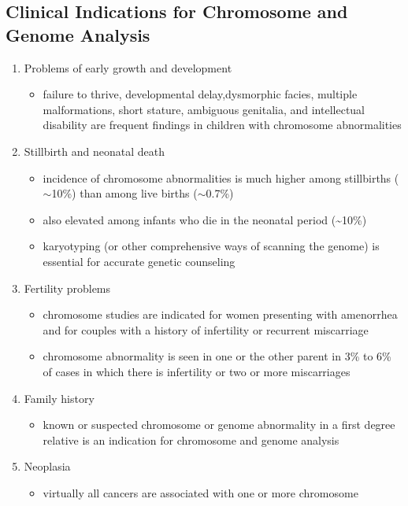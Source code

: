 \documentclass{scrartcl}
\begin{document}
\subsection{Clinical Indications for Chromosome and Genome Analysis}
\label{sec:orgbe95daf}
\begin{enumerate}
\item Problems of early growth and development
\label{sec:org5ad2b80}
\begin{itemize}
\item failure to thrive, developmental delay,dysmorphic facies, multiple
malformations, short stature, ambiguous genitalia, and
intellectual disability are frequent findings in children with
chromosome abnormalities
\end{itemize}
\item Stillbirth and neonatal death
\label{sec:orgbf22e3a}
\begin{itemize}
\item incidence of chromosome abnormalities is much higher among
stillbirths (\(\sim\)10\%) than among live births (\(\sim\)0.7\%)
\item also elevated among infants who die in the neonatal period (\textasciitilde{}10\%)
\item karyotyping (or other comprehensive ways of scanning the genome) is
essential for accurate genetic counseling
\end{itemize}
\item Fertility problems
\label{sec:org7eff294}
\begin{itemize}
\item chromosome studies are indicated for women presenting with
amenorrhea and for couples with a history of infertility or recurrent miscarriage
\item chromosome abnormality is seen in one or the other parent in 3\% to
6\% of cases in which there is infertility or two or more
miscarriages
\end{itemize}
\item Family history
\label{sec:org11b94fa}
\begin{itemize}
\item known or suspected chromosome or genome abnormality in a first
degree relative is an indication for chromosome and genome analysis
\end{itemize}
\item Neoplasia
\label{sec:org7418678}
\begin{itemize}
\item virtually all cancers are associated with one or more chromosome

\end{itemize}
\end{enumerate}
\end{document}
